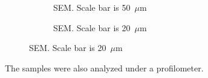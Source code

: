 \begin{figure}[htb]
\begin{subfigure}[t]{0.24\linewidth}
    	\centering
    	\caption{SEM. Scale bar is 50~$\mu$m}
    	\label{fig:b2d28_q28}
    \end{subfigure}
    \hfill
    \begin{subfigure}[t]{0.24\linewidth}
    	\centering
    	\caption{SEM. Scale bar is 20~$\mu$m}
    	\label{fig:b2d29_q29}
    \end{subfigure}
\end{figure}


The samples were also analyzed under a profilometer.

